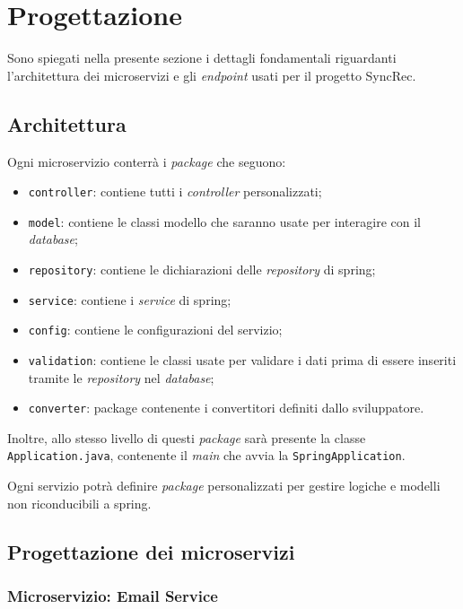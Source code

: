 \section{Progettazione}\label{sec:progettazione}

Sono spiegati nella presente sezione i dettagli fondamentali riguardanti l'architettura dei microservizi e gli \textit{endpoint} usati per il progetto SyncRec.

\subsection{Architettura}
Ogni \gls{microservizio} conterrà i \textit{package} che seguono:

\begin{itemize}
	\item \texttt{controller}: contiene tutti i \textit{controller} personalizzati;
	\item \texttt{model}: contiene le classi modello che saranno usate per interagire con il \textit{database};
	\item \texttt{repository}: contiene le dichiarazioni delle \textit{repository} di \gls{spring};
	\item \texttt{service}: contiene i \textit{service} di \gls{spring};
	\item \texttt{config}: contiene le configurazioni del servizio;
	\item \texttt{validation}: contiene le classi usate per validare i dati prima di essere inseriti tramite le \textit{repository} nel \textit{database};
	\item \texttt{converter}: package contenente i convertitori definiti dallo sviluppatore.
\end{itemize}

Inoltre, allo stesso livello di questi \textit{package} sarà presente la classe \texttt{Application.java}, contenente il \textit{main}
che avvia la \texttt{SpringApplication}.

Ogni servizio potrà definire \textit{package} personalizzati per gestire logiche e modelli non riconducibili a \gls{spring}.


\subsection{Progettazione dei microservizi}\label{prog-microservizi}

\subsubsection{Microservizio: Email Service}

